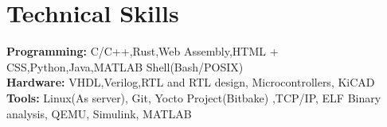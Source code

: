 \documentclass[a4paper,12pt]{article}
\begin{document}
\vspace{-.25cm} \section*{Technical Skills}
\textbf{Programming:}
C/C++,Rust,Web Assembly,HTML + CSS,Python,Java,MATLAB Shell(Bash/POSIX) \\ 
\textbf{Hardware:}
VHDL,Verilog,RTL and RTL design, Microcontrollers, KiCAD\\ \textbf{Tools:}
Linux(As server), Git, Yocto Project(Bitbake) ,TCP/IP,
ELF Binary analysis, QEMU, Simulink, MATLAB
\end{document}
